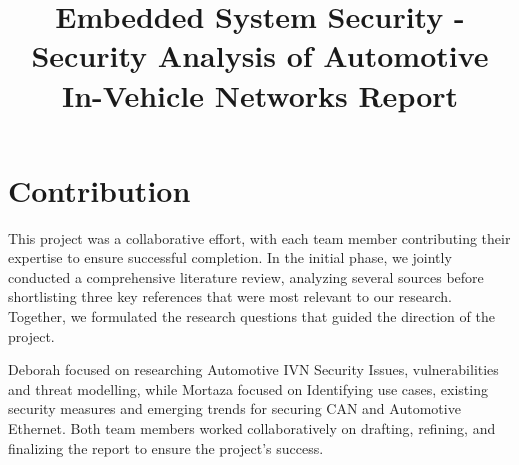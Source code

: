 \documentclass{report}
\title{Embedded System Security - Security Analysis of  Automotive In-Vehicle Networks Report} %
\begin{document}

\subject{Embedded System Security} %




\buildmargins %
\buildcover %
\toc %

\section*{Contribution}
This project was a collaborative effort, with each team member contributing their expertise to ensure successful completion. In the initial phase, we jointly conducted a comprehensive literature review, analyzing several sources before shortlisting three key references that were most relevant to our research. Together, we formulated the research questions that guided the direction of the project. 

Deborah focused on researching Automotive IVN Security Issues, vulnerabilities and threat modelling, while Mortaza focused on Identifying use cases, existing security measures and emerging trends for securing CAN and Automotive Ethernet. Both team members worked collaboratively on drafting, refining, and finalizing the report to ensure the project's success.
\end{document}
